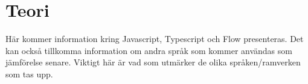 \section{Teori}
\label{sec:alexander-theory}

Här kommer information kring Javascript, Typescript och Flow presenteras. Det kan också tillkomma information om andra språk som kommer användas som jämförelse senare. Viktigt här är vad som utmärker de olika språken/ramverken som tas upp.